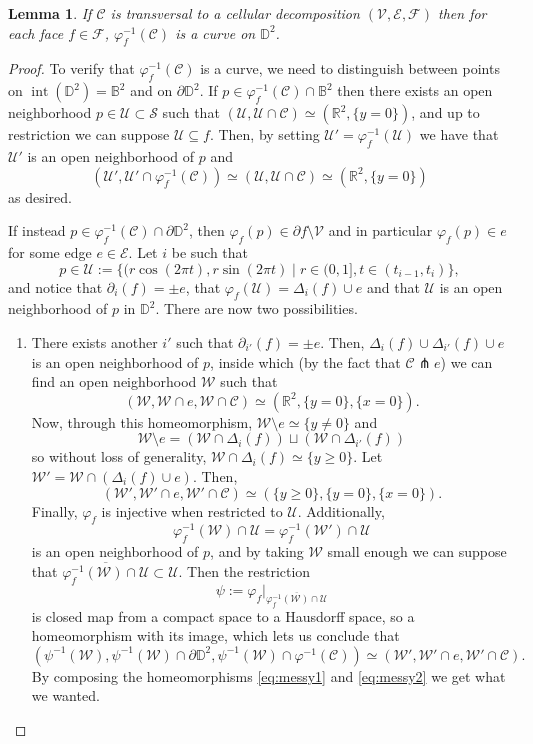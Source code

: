 \documentclass[11pt,reqno]{amsart}
\theoremstyle{plain}
\newtheorem{lemma}[subsection]{Lemma}
\theoremstyle{definition}
\theoremstyle{remark}
\numberwithin{equation}{subsection}
\newcommand*{\bbB}{\mathbb{B}}
\newcommand*{\bbD}{\mathbb{D}}
\newcommand*{\bbR}{\mathbb{R}}
\newcommand*{\calC}{\mathcal{C}}
\newcommand*{\calE}{\mathcal{E}}
\newcommand*{\calF}{\mathcal{F}}
\newcommand*{\calS}{\mathcal{S}}
\newcommand*{\calU}{\mathcal{U}}
\newcommand*{\calV}{\mathcal{V}}
\newcommand*{\calW}{\mathcal{W}}
\DeclareMathOperator{\interior}{int}
\begin{document}
\begin{lemma}\label{lem:curveD2}
    If $\calC$ is transversal to a cellular decomposition $(\calV,\calE,\calF)$ then for each face $f\in\calF$, $\varphi^{-1}_f(\calC)$ is a curve on $\bbD^2$.
\end{lemma}
\begin{proof}
    To verify that $\varphi_f^{-1}(\calC)$ is a curve, we need to distinguish between points on $\interior(\bbD^2)=\bbB^2$ and on $\partial\bbD^2$. If $p\in\varphi_f^{-1}(\calC)\cap\bbB^2$ then there exists an open neighborhood $p\in\calU\subset\calS$ such that $(\calU,\calU\cap\calC)\simeq(\bbR^2,\{y=0\})$, and up to restriction we can suppose $\calU\subseteq f$.
    Then, by setting $\calU'=\varphi^{-1}_f(\calU)$ we have that $\calU'$ is an open neighborhood of $p$ and
    \[(\calU',\calU'\cap\varphi_f^{-1}(\calC))\simeq(\calU,\calU\cap\calC)\simeq(\bbR^2,\{y=0\})\]
    as desired.

    If instead $p\in\varphi_f^{-1}(\calC)\cap\partial\bbD^2$, then $\varphi_f(p)\in\partial f\setminus\calV$ and in particular $\varphi_f(p)\in e$ for some edge $e\in\calE$. Let $i$ be such that
    \[p\in \calU:=\{(r\cos(2\pi t),r\sin(2\pi t)\mid r\in(0,1],t\in(t_{i-1},t_i)\},\]
    and notice that $\partial_i(f)=\pm e$, that $\varphi_f(\calU)=\Delta_i(f)\cup e$ and that $\calU$ is an open neighborhood of $p$ in $\bbD^2$. There are now two possibilities.
    \begin{enumerate}
        \item There exists another $i'$ such that $\partial_{i'}(f)=\pm e$. Then, $\Delta_i(f)\cup\Delta_{i'}(f)\cup e$ is an open neighborhood of $p$, inside which (by the fact that $\calC\pitchfork e$) we can find an open neighborhood $\calW$ such that
        \[(\calW,\calW\cap e,\calW\cap\calC)\simeq(\bbR^2,\{y=0\},\{x=0\}).\]
        Now, through this homeomorphism, $\calW\setminus e\simeq\{y\neq0\}$ and
        \[\calW\setminus e=(\calW\cap\Delta_i(f))\sqcup(\calW\cap\Delta_{i'}(f))\]
        so without loss of generality, $\calW\cap\Delta_i(f)\simeq\{y\ge0\}$. Let $\calW'=\calW\cap(\Delta_i(f)\cup e)$. Then,
        \begin{equation}\label{eq:messy1}
            (\calW',\calW'\cap e,\calW'\cap\calC)\simeq(\{y\ge0\},\{y=0\},\{x=0\}).
        \end{equation}
        Finally, $\varphi_f$ is injective when restricted to $\calU$. Additionally,
        \[\varphi_f^{-1}(\calW)\cap\calU=\varphi_f^{-1}(\calW')\cap\calU\]
        is an open neighborhood of $p$, and by taking $\calW$ small enough we can suppose that $\overline{\varphi_f^{-1}(\calW)\cap\calU}\subset\calU$. Then the restriction
        \[\psi:=\varphi_f|_{\overline{\varphi_f^{-1}(\calW)\cap\calU}}\]
        is closed map from a compact space to a Hausdorff space, so a homeomorphism with its image, which lets us conclude that
        \begin{equation}\label{eq:messy2}
            (\psi^{-1}(\calW),\psi^{-1}(\calW)\cap\partial\bbD^2,\psi^{-1}(\calW)\cap\varphi^{-1}(\calC))\simeq(\calW',\calW'\cap e,\calW'\cap\calC).
        \end{equation}
        By composing the homeomorphisms \eqref{eq:messy1} and \eqref{eq:messy2} we get what we wanted.


\end{enumerate}
\end{proof}
\end{document}
